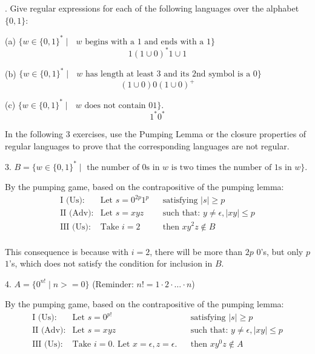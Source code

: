 \documentclass[12pt,letterpaper,final]{report}
\begin{document}
.	Give regular expressions for each of the following languages over the alphabet $\{0,1\}$:
\medskip

(a)	$\{w \in  \{0, 1\}^* \mid \mbox{ $w$ begins with a $1$ and ends with a $1$}\}$
\[
  1(1 \cup 0)^*1 \cup 1
\]

(b)	$\{w  \in \{0, 1\}^*  \mid \mbox{ $w$ has length at least $3$ and its 2nd symbol is a $0$}\}$
\[
  (1 \cup 0)0(1 \cup 0)^+
\]

(c)	$\{w  \in \{0, 1\}^*  \mid \mbox{ $w$ does not contain $01$} \}$.
\[
  1^*0^*
\]

\medskip

\pagebreak
In the following $3$ exercises, use the Pumping Lemma or the closure properties of regular languages to prove that the  corresponding languages are not regular.
\medskip

3. 	$B=\{w  \in \{0, 1\}^* \mid \mbox{ the number of 0s in $w$ is two times the number of 1s in $w$}\}$.
\smallskip

By the pumping game, based on the contrapositive of the pumping lemma:
\[
  \begin{array}{llll}
    \text{I (Us):}   & \text{Let } s = 0^{2p}1^p &  & \text{satisfying } \vert s \vert \ge p                     \\
    \text{II (Adv):} & \text{Let }s =  xyz       &  & \text{such that: } y \not = \epsilon, \vert xy \vert \le p \\
    \text{III (Us):} & \text{Take } i = 2        &  & \text{then } xy^2z \not \in B                              \\
  \end{array}
\]

This consequence is because with $i=2$, there will be more than $2p$ $0$'s, but only $p$ $1$'s, which does not satisfy the condition for inclusion in $B$.

\medskip

4. 	$A = \{0^{n!} \mid n >= 0 \}$ (Reminder: $n! = 1  \cdot 2 \cdot  \ldots \cdot  n$)
\medskip

By the pumping game, based on the contrapositive of the pumping lemma:
\[
  \begin{array}{llll}
    \text{I (Us):}   & \text{Let } s = 0^{p!}                                        &  & \text{satisfying } \vert s \vert \ge p                     \\
    \text{II (Adv):} & \text{Let }s =  xyz                                           &  & \text{such that: } y \not = \epsilon, \vert xy \vert \le p \\
    \text{III (Us):} & \text{Take } i = 0. \text{ Let $x = \epsilon, z = \epsilon$.} &  & \text{then } xy^0z \not \in A                              \\
  \end{array}
\]
\end{document}
